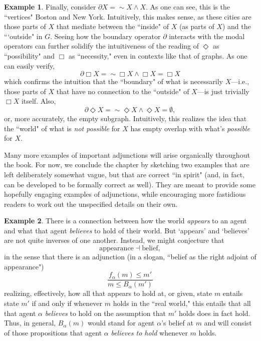 \documentclass[a4paper]{book}
\theoremstyle{definition}
\newtheorem{example}{Example}[section]
\theoremstyle{definition}
\theoremstyle{definition}
\theoremstyle{theorem}
\theoremstyle{definition}
\begin{document}
\begin{example}
	Finally, consider $\partial X = \sim X \wedge X$. As one can see, this is the ``vertices" Boston and New York. Intuitively, this makes sense, as these cities are those parts of $X$ that mediate between the ``inside" of $X$ (as parts of $X$) and the ```outside" in $G$. Seeing how the boundary operator $\partial$ interacts with the modal operators can further solidify the intuitiveness of the reading of $\Diamond$ as ``possibility" and $\Box$ as ``necessity," even in contexts like that of graphs. As one can easily verify, 
	\begin{equation*}
	\partial \Box X = \sim \Box X \wedge \Box X = \Box X
	\end{equation*}   
	which confirms the intuition that the ``boundary" of what is necessarily $X$---i.e., those parts of $X$ that have no connection to the ``outside" of $X$---is just trivially $\Box X$ itself. Also, 
	\begin{equation*}
	\partial \Diamond X = \sim \Diamond X \wedge \Diamond X = \emptyset,
	\end{equation*}  
	or, more accurately, the empty subgraph. Intuitively, this realizes the idea that the ``world" of what is \textit{not possible} for $X$ has empty overlap with what's \textit{possible} for $X$. 
\end{example} 
Many more examples of important adjunctions will arise organically throughout the book. For now, we conclude the chapter by sketching two examples that are left deliberately somewhat vague, but that are correct ``in spirit" (and, in fact, can be developed to be formally correct as well). They are meant to provide some hopefully engaging examples of adjunctions, while encouraging more fastidious readers to work out the unspecified details on their own. 
\begin{example}
	There is a connection between how the world \textit{appears} to an agent and what that agent \textit{believes} to hold of their world. But `appears' and `believes' are not quite inverses of one another. Instead, we might conjecture that
	\begin{equation*}
	\text{appearance} \dashv \text{belief}, 
	\end{equation*}
	in the sense that there is an adjunction (in a slogan, ``belief as the right adjoint of appearance")
	\begin{equation*}
	\frac{f_{\alpha}(m) \leq m'}{m \leq B_{\alpha}(m')} 
	\end{equation*} 
	realizing, effectively, how all that appears to hold at, or given, state $m$ entails state $m'$ if and only if whenever $m$ holds in the ``real world," this entails that all that agent $\alpha$ \textit{believes} to hold on the assumption that $m'$ holds does in fact hold.  Thus, in general, $B_{\alpha}(m)$ would stand for agent $\alpha$'s belief at $m$ and will consist of those propositions that agent $\alpha$ \textit{believes to hold} whenever $m$ holds. 
\end{example}
\end{document}
